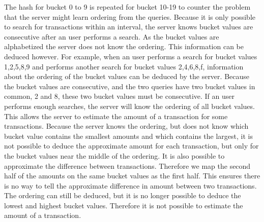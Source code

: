 \documentclass[a4paper]{article}
\begin{document}
        The hash for bucket 0 to 9 is repeated for bucket 10-19 to counter the problem that the server might learn ordering from the queries. Because it is only possible to search for transactions within an interval, the server knows bucket values are consecutive after an user performs a search. As the bucket values are alphabetized the server does not know the ordering. This information can be deduced however. For example, when an user performs a search for bucket values 1,2,5,8,9 and performs another search for bucket values 2,4,6,8,f, information about the ordering of the bucket values can be deduced by the server. Because the bucket values are consecutive, and the two queries have two bucket values in common, 2 and 8, these two bucket values must be consecutive. If an user performs enough searches, the server will know the ordering of all bucket values. This allows the server to estimate the amount of a transaction for some transactions. Because the server knows the ordering, but does not know which bucket value contains the smallest amounts and which contains the largest, it is not possible to deduce the approximate amount for each transaction, but only for the bucket values near the middle of the ordering. It is also possible to approximate the difference between transactions. Therefore we map the second half of the amounts on the same bucket values as the first half. This ensures there is no way to tell the approximate difference in amount between two transactions. The ordering can still be deduced, but it is no longer possible to deduce the lowest and highest bucket values. Therefore it is not possible to estimate the amount of a transaction.
        
        
        
        
        
\end{document}
